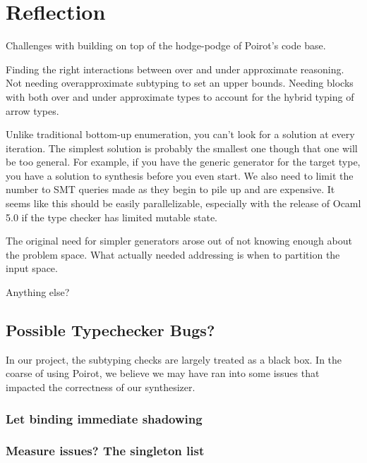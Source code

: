 \documentclass[review, sigplan]{acmart}
\begin{document}
\section{Reflection}

Challenges with building on top of the hodge-podge of Poirot's code base.

Finding the right interactions between over and under approximate reasoning. Not
needing overapproximate subtyping to set an upper bounds. Needing blocks with
both over and under approximate types to account for the hybrid typing of arrow
types.

Unlike traditional bottom-up enumeration, you can't look for a solution at every
iteration. The simplest solution is probably the smallest one though that one will
be too general. For example, if you have the generic generator for the target
type, you have a solution to synthesis before you even start. We also need to
limit the number to SMT queries made as they begin to pile up and are expensive.
It seems like this should be easily parallelizable, especially with the release
of Ocaml 5.0 if the type checker has limited mutable state.

The original need for simpler generators arose out of not knowing enough about
the problem space. What actually needed addressing is when to partition the
input space.

Anything else?

\subsection{Possible Typechecker Bugs?}
In our project, the subtyping checks are largely treated as a black box. In the
coarse of using Poirot, we believe we may have ran into some issues that
impacted the correctness of our synthesizer.

\subsubsection{Let binding immediate shadowing}

\subsubsection{Measure issues? The singleton list}
\end{document}
